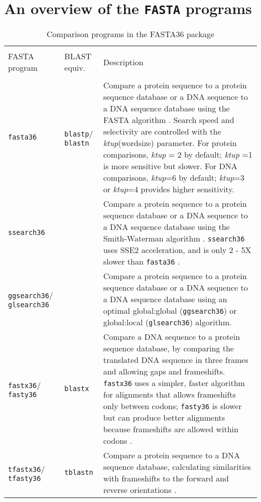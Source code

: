\documentclass[11pt]{article}
\begin{document}
\section{An overview of the \texttt{FASTA} programs}

\begin{table}
\caption{\label{table1} Comparison programs in the FASTA36 package}
\vspace{0.5ex}
\begin{tabular}{ p{0.8in} p{0.6in} p{4.6 in}}
\hline \\[-1.0ex]
FASTA \mbox{program} & BLAST equiv. & Description \\[1.2ex]
\hline \\[-1.0ex]
\texttt{fasta36} & \texttt{blastp}/ \texttt{blastn} &
Compare a protein sequence to a protein sequence 
database or a DNA sequence to a DNA sequence database using the FASTA 
algorithm \cite{wrp881,wrp960}.  Search speed and selectivity are 
controlled with the \emph{ktup}(wordsize) parameter.  For protein 
comparisons, \emph{ktup} = 2 by default; \emph{ktup} =1 is more sensitive 
but slower.  For DNA comparisons, \emph{ktup}=6 by default; \emph{ktup}=3 or 
\emph{ktup}=4 provides higher sensitivity.\\[1 ex]

\texttt{ssearch36} &  & Compare a protein sequence to a protein sequence 
database or a DNA sequence to a DNA sequence database using the 
Smith-Waterman algorithm \cite{wat815}. \texttt{ssearch36} uses SSE2
acceleration, and is only 2 - 5X slower than \texttt{fasta36} \cite{farrar2007}. \\[1 ex]

\texttt{ggsearch36}/ \texttt{glsearch36} &  & Compare a protein sequence to a protein sequence 
database or a DNA sequence to a DNA sequence database using
an optimal global:global (\texttt{ggsearch36}) or global:local
(\texttt{glsearch36}) algorithm.\\[1 ex]

\texttt{fastx36}/ \texttt{fasty36} & \texttt{blastx} &
Compare a DNA sequence to a protein
sequence database, by comparing the translated DNA sequence in three
frames and allowing gaps and frameshifts.  \texttt{fastx36} uses a
simpler, faster algorithm for alignments that allows frameshifts only
between codons; \texttt{fasty36} is slower but can produce better alignments
because frameshifts are allowed within codons \cite{wrp971}.\\[1 ex]

\texttt{tfastx36}/ \texttt{tfasty36}& \texttt{tblastn} &
Compare a protein sequence to a DNA sequence
database, calculating similarities with frameshifts to the forward and
reverse orientations  \cite{wrp971}.\\[1 ex]


\end{tabular}
\end{table}
\end{document}
